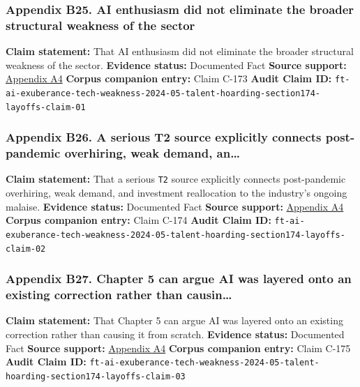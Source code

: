 \documentclass[
  american,
  11pt,
  letterpaper,
]{article}
\begin{document}
\subsubsection{Appendix B25. AI enthusiasm did not eliminate the broader
structural weakness of the
sector}\label{appendix-b25-ai-enthusiasm-did-not-eliminate-the-broader-structural-weakness-of-the-sector}

\textbf{Claim statement:} That AI enthusiasm did not eliminate the
broader structural weakness of the sector. \textbf{Evidence status:}
Documented Fact \textbf{Source support:}
\hyperref[appendix-a4-ai-exuberance-masks-broad-weakness-in-tech-sector-say-investors]{Appendix
A4} \textbf{Corpus companion entry:} Claim C-173 \textbf{Audit Claim
ID:}
\texttt{ft-ai-exuberance-tech-weakness-2024-05-talent-hoarding-section174-layoffs-claim-01}

\subsubsection{Appendix B26. A serious T2 source explicitly connects
post-pandemic overhiring, weak demand,
an\ldots{}}\label{appendix-b26-a-serious-t2-source-explicitly-connects-post-pandemic-overhiring-weak-demand-an}

\textbf{Claim statement:} That a serious \texttt{T2} source explicitly
connects post-pandemic overhiring, weak demand, and investment
reallocation to the industry's ongoing malaise. \textbf{Evidence
status:} Documented Fact \textbf{Source support:}
\hyperref[appendix-a4-ai-exuberance-masks-broad-weakness-in-tech-sector-say-investors]{Appendix
A4} \textbf{Corpus companion entry:} Claim C-174 \textbf{Audit Claim
ID:}
\texttt{ft-ai-exuberance-tech-weakness-2024-05-talent-hoarding-section174-layoffs-claim-02}

\subsubsection{Appendix B27. Chapter 5 can argue AI was layered onto an
existing correction rather than
causin\ldots{}}\label{appendix-b27-chapter-5-can-argue-ai-was-layered-onto-an-existing-correction-rather-than-causin}

\textbf{Claim statement:} That Chapter 5 can argue AI was layered onto
an existing correction rather than causing it from scratch.
\textbf{Evidence status:} Documented Fact \textbf{Source support:}
\hyperref[appendix-a4-ai-exuberance-masks-broad-weakness-in-tech-sector-say-investors]{Appendix
A4} \textbf{Corpus companion entry:} Claim C-175 \textbf{Audit Claim
ID:}
\texttt{ft-ai-exuberance-tech-weakness-2024-05-talent-hoarding-section174-layoffs-claim-03}
\end{document}
